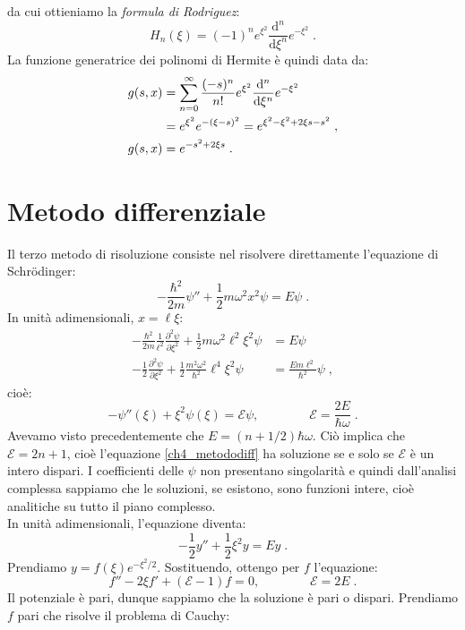 \documentclass[10pt,a4paper]{report}
\theoremstyle{definition}
\newcommand{\pdev}[3][]{\frac{\partial^{#1} #2}{\partial #3^{#1}}}
\numberwithin{equation}{section}
\newcommand{\diff}[1][]{\mathrm{d}#1}
\newcommand{\Sch}{Schrödinger}
\begin{document}
da cui ottieniamo la \textit{formula di Rodriguez}:
\begin{equation}
H_n(\xi)=(-1)^n e^{\xi^2}\frac{\diff^n}{\diff{\xi}^n}e^{-\xi^2}\;.
\end{equation}
La funzione generatrice dei polinomi di Hermite è quindi data da:
\begin{align}
g(s,x)&=\sum_{n=0}^{\infty}\frac{(-s)^n}{n!}e^{\xi^2}\frac{\diff^n}{\diff{\xi}^n}e^{-\xi^2} \notag \\
&= e^{\xi^2}e^{-(\xi-s)^2}=e^{\xi^2-\xi^2+2\xi s-s^2}\;, \notag \\
g(s,x) &= e^{-s^2+2\xi s}\;.
\end{align}
\section{Metodo differenziale}
Il terzo metodo di risoluzione consiste nel risolvere direttamente l'equazione di \Sch:
\begin{equation}
-\frac{\hbar^2}{2m}\psi''+\frac{1}{2}m\omega^2x^2\psi=E\psi\;.
\end{equation}
In unità adimensionali, $x=\ell\xi$:
\begin{align*}
-\frac{\hbar^2}{2m}\frac{1}{\ell^2}\pdev[2]{\psi}{\xi}+\frac{1}{2}m\omega^2\ell^2\xi^2\psi&=E\psi \\
-\frac{1}{2}\pdev[2]{\psi}{\xi}+\frac{1}{2}\frac{m^2\omega^2}{\hbar^2}\ell^4\xi^2\psi&=\frac{Em\ell^2}{\hbar^2}\psi\;,
\end{align*}
cioè:
\begin{equation}
-\psi''(\xi)+\xi^2\psi(\xi)=\mathcal{E}\psi,\qquad \qquad \mathcal{E}=\frac{2E}{\hbar\omega}\;. \label{ch4_metododiff}
\end{equation}
Avevamo visto precedentemente che $E=(n+1/2)\hbar\omega$. Ciò implica che $\mathcal{E}=2n+1$, cioè l'equazione \eqref{ch4_metododiff} ha soluzione se e solo se $\mathcal{E}$ è un intero dispari. I coefficienti delle $\psi$ non presentano singolarità e quindi dall'analisi complessa sappiamo che le soluzioni, se esistono, sono funzioni intere, cioè analitiche su tutto il piano complesso. \\
In unità adimensionali, l'equazione diventa:
$$
-\frac{1}{2}y''+\frac{1}{2}\xi^2y=Ey\;.
$$
Prendiamo $y=f(\xi)e^{-\xi^2/2}$. Sostituendo, ottengo per $f$ l'equazione:
\begin{equation}
f''-2\xi f'+(\mathcal{E}-1)f=0,\qquad\qquad \mathcal{E}=2E\;.
\end{equation}
Il potenziale è pari, dunque sappiamo che la soluzione è pari o dispari. Prendiamo $f$ pari che risolve il problema di Cauchy:
\end{document}
